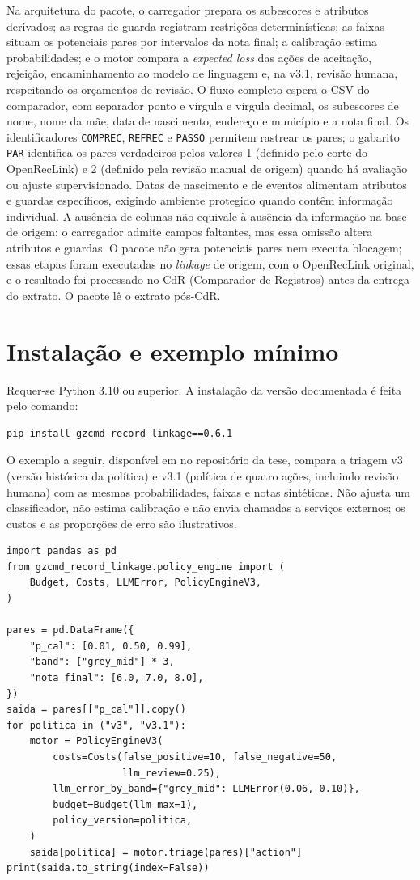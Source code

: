 Na arquitetura do pacote, o carregador prepara os subescores e atributos derivados; as regras de guarda registram restrições determinísticas; as faixas situam os potenciais pares por intervalos da nota final; a calibração estima probabilidades; e o motor compara a \textit{expected loss} das ações de aceitação, rejeição, encaminhamento ao modelo de linguagem e, na v3.1, revisão humana, respeitando os orçamentos de revisão. O fluxo completo espera o CSV do comparador, com separador ponto e vírgula e vírgula decimal, os subescores de nome, nome da mãe, data de nascimento, endereço e município e a nota final. Os identificadores \texttt{COMPREC}, \texttt{REFREC} e \texttt{PASSO} permitem rastrear os pares; o gabarito \texttt{PAR} identifica os pares verdadeiros pelos valores 1 (definido pelo corte do OpenRecLink) e 2 (definido pela revisão manual de origem) quando há avaliação ou ajuste supervisionado. Datas de nascimento e de eventos alimentam atributos e guardas específicos, exigindo ambiente protegido quando contêm informação individual. A ausência de colunas não equivale à ausência da informação na base de origem: o carregador admite campos faltantes, mas essa omissão altera atributos e guardas. O pacote não gera potenciais pares nem executa blocagem; essas etapas foram executadas no \textit{linkage} de origem, com o OpenRecLink original, e o resultado foi processado no CdR (Comparador de Registros) antes da entrega do extrato. O pacote lê o extrato pós-CdR.

\section{Instalação e exemplo mínimo}

Requer-se Python 3.10 ou superior. A instalação da versão documentada é feita pelo comando:
\begin{verbatim}
pip install gzcmd-record-linkage==0.6.1
\end{verbatim}

O exemplo a seguir, disponível em  no repositório da tese, compara a triagem v3 (versão histórica da política) e v3.1 (política de quatro ações, incluindo revisão humana) com as mesmas probabilidades, faixas e notas sintéticas. Não ajusta um classificador, não estima calibração e não envia chamadas a serviços externos; os custos e as proporções de erro são ilustrativos.

\begingroup\small
\begin{verbatim}
import pandas as pd
from gzcmd_record_linkage.policy_engine import (
    Budget, Costs, LLMError, PolicyEngineV3,
)

pares = pd.DataFrame({
    "p_cal": [0.01, 0.50, 0.99],
    "band": ["grey_mid"] * 3,
    "nota_final": [6.0, 7.0, 8.0],
})
saida = pares[["p_cal"]].copy()
for politica in ("v3", "v3.1"):
    motor = PolicyEngineV3(
        costs=Costs(false_positive=10, false_negative=50,
                    llm_review=0.25),
        llm_error_by_band={"grey_mid": LLMError(0.06, 0.10)},
        budget=Budget(llm_max=1),
        policy_version=politica,
    )
    saida[politica] = motor.triage(pares)["action"]
print(saida.to_string(index=False))
\end{verbatim}
\endgroup

